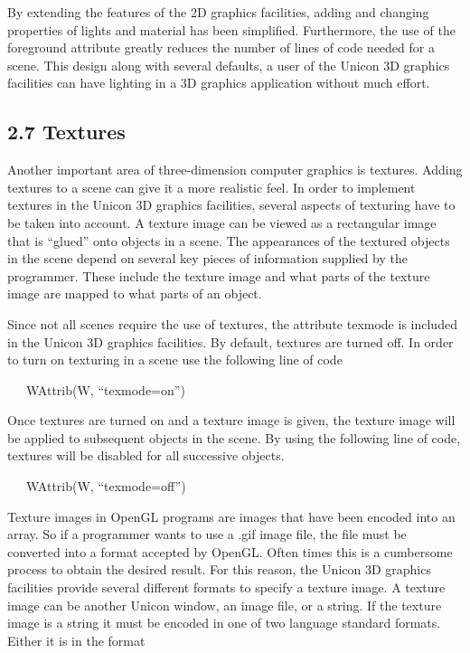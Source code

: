 \documentclass[letterpaper]{article}
\begin{document}
By extending the features of the 2D graphics facilities, adding and
changing properties of lights and material has been simplified.
Furthermore, the use of the foreground attribute greatly reduces
the number of lines of code needed for a scene. This design along
with several defaults, a user of the Unicon 3D graphics facilities
can have lighting in a 3D graphics application without much effort.


\subsection[2.7 Textures]{2.7 Textures}

Another important area of three-dimension computer graphics is
textures. Adding textures to a scene can give it a more realistic
feel. In order to implement textures in the Unicon 3D graphics
facilities, several aspects of texturing have to be taken into
account. A texture image can be viewed as a rectangular image that is
``glued'' onto objects in a scene. The appearances of the textured
objects in the scene depend on several key pieces of information
supplied by the programmer. These include the texture image and what
parts of the texture image are mapped to what parts of an object.

Since not all scenes require the use of textures, the attribute
\textsf{texmode} is included in the Unicon 3D graphics facilities. By
default, textures are turned off. In order to turn on texturing in a
scene use the following line of code

{\ttfamily
\ \ \ \textsf{WAttrib(W, ``texmode=on'')} }

Once textures are turned on and a texture image is given, the texture
image will be applied to subsequent objects in the scene. By using the
following line of code, textures will be disabled for all successive
objects.

{\ttfamily
\ \ \ \textsf{WAttrib(W, ``texmode=off'')}}

Texture images in OpenGL programs are images that have been encoded
into an array. So if a programmer wants to use a .gif image file, the
file must be converted into a format accepted by OpenGL. Often times
this is a cumbersome process to obtain the desired result. For this
reason, the Unicon 3D graphics facilities provide several different
formats to specify a texture image. A texture image can be another
Unicon window, an image file, or a string. If the texture image is a
string it must be encoded in one of two language standard
formats. Either it is in the format
\end{document}

